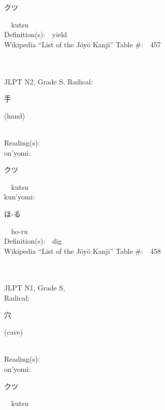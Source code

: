 \begin{multicols}{2}
{\hspace*{2em}}{\begin{CJK}{UTF8}{min} クツ \end{CJK}}\ \ kutsu\ \ \\
Definition(s):\ \ yield \\
Wikipedia ``List of the J\=oy\=o Kanji'' Table \#:\ \ 457 \\
\ \ \\
{\fontsize{34pt}{40pt}  }\ \ \\  %
{JLPT N2, Grade S, Radical:\ \ {\begin{CJK}{UTF8}{min} 手 \end{CJK}} (hand) } \\
Reading(s):\ \ \\
{\hspace*{1em}}on'yomi:\ \ \\
{\hspace*{2em}}{\begin{CJK}{UTF8}{min} クツ \end{CJK}}\ \ kutsu\ \ \\
{\hspace*{1em}}kun'yomi:\ \ \\
{\hspace*{2em}}{\begin{CJK}{UTF8}{min} ほ-る \end{CJK}}\ \ ho-ru\ \ \\
Definition(s):\ \ dig \\
Wikipedia ``List of the J\=oy\=o Kanji'' Table \#:\ \ 458 \\
\ \ \\
{\fontsize{34pt}{40pt}  }\ \ \\
{JLPT N1, Grade S, \\Radical:\ \ {\begin{CJK}{UTF8}{min} 穴 \end{CJK}} (cave) } \\
Reading(s):\ \ \\
{\hspace*{1em}}on'yomi:\ \ \\
{\hspace*{2em}}{\begin{CJK}{UTF8}{min} クツ \end{CJK}}\ \ kutsu\ \ \\

\end{multicols}
